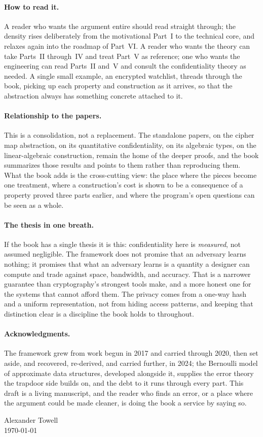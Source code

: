 \paragraph{How to read it.}
A reader who wants the argument entire should read straight through; the
density rises deliberately from the motivational Part~I to the technical
core, and relaxes again into the roadmap of Part~VI. A reader who wants the
theory can take Parts~II through~IV and treat Part~V as reference; one who
wants the engineering can read Parts~II and~V and consult the confidentiality
theory as needed. A single small example, an encrypted watchlist, threads
through the book, picking up each property and construction as it arrives, so
that the abstraction always has something concrete attached to it.

\paragraph{Relationship to the papers.}
This is a consolidation, not a replacement. The standalone papers, on the
cipher map abstraction, on its quantitative confidentiality, on its algebraic
types, on the linear-algebraic construction, remain the home of the deeper
proofs, and the book summarizes those results and points to them rather than
reproducing them. What the book adds is the cross-cutting view: the place
where the pieces become one treatment, where a construction's cost is shown
to be a consequence of a property proved three parts earlier, and where the
program's open questions can be seen as a whole.

\paragraph{The thesis in one breath.}
If the book has a single thesis it is this: confidentiality here is
\emph{measured}, not assumed negligible. The framework does not promise that
an adversary learns nothing; it promises that what an adversary learns is a
quantity a designer can compute and trade against space, bandwidth, and
accuracy. That is a narrower guarantee than cryptography's strongest tools
make, and a more honest one for the systems that cannot afford them. The
privacy comes from a one-way hash and a uniform representation, not from
hiding access patterns, and keeping that distinction clear is a discipline
the book holds to throughout.

\paragraph{Acknowledgments.}
The framework grew from work begun in 2017 and carried through 2020, then set
aside, and recovered, re-derived, and carried further, in 2024; the Bernoulli
model of approximate data structures, developed alongside it, supplies the
error theory the trapdoor side builds on, and the debt to it runs through
every part. This draft is a living manuscript, and the
reader who finds an error, or a place where the argument could be made
cleaner, is doing the book a service by saying so.

\bigskip
\noindent Alexander Towell\\
\today
